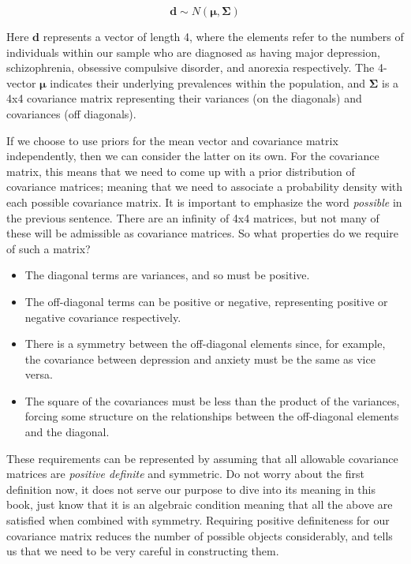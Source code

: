\documentclass[11pt,fullpage]{book}
\begin{document}
\begin{equation}
\boldsymbol{d} \sim N(\boldsymbol{\mu},\boldsymbol{\Sigma})
\end{equation}

Here $\boldsymbol{d}$ represents a vector of length 4, where the elements refer to the numbers of individuals within our sample who are diagnosed as having  major depression, schizophrenia, obsessive compulsive disorder, and anorexia respectively. The 4-vector $\boldsymbol{\mu}$ indicates their underlying prevalences within the population, and $\boldsymbol{\Sigma}$ is a 4x4 covariance matrix representing their variances (on the diagonals) and covariances (off diagonals). 

If we choose to use priors for the mean vector and covariance matrix independently, then we can consider the latter on its own. For the covariance matrix, this means that we need to come up with a prior distribution of covariance matrices; meaning that we need to associate a probability density with each possible covariance matrix. It is important to emphasize the word \textit{possible} in the previous sentence. There are an infinity of 4x4 matrices, but not many of these will be admissible as covariance matrices. So what properties do we require of such a matrix?

\begin{itemize}
\item The diagonal terms are variances, and so must be positive.
\item The off-diagonal terms can be positive or negative, representing positive or negative covariance respectively.
\item There is a symmetry between the off-diagonal elements since, for example, the covariance between depression and anxiety must be the same as vice versa.
\item The square of the covariances must be less than the product of the variances, forcing some structure on the relationships between the off-diagonal elements and the diagonal.
\end{itemize}

These requirements can be represented by assuming that all allowable covariance matrices are \textit{positive definite} and symmetric. Do not worry about the first definition now, it does not serve our purpose to dive into its meaning in this book, just know that it is an algebraic condition meaning that all the above are satisfied when combined with symmetry. Requiring positive definiteness for our covariance matrix reduces the number of possible objects considerably, and tells us that we need to be very careful in constructing them.
\end{document}
